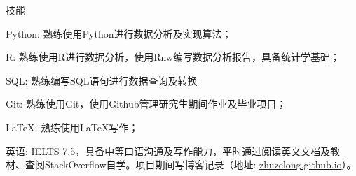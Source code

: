 \documentclass{resume} %
\begin{document}
\begin{rSection}{技能}

\begin{rSubsection}{}{}{}{}
\item {Python:} 熟练使用Python进行数据分析及实现算法；
\item {R:} 熟练使用R进行数据分析，使用Rnw编写数据分析报告，具备统计学基础；
\item {SQL:} 熟练编写SQL语句进行数据查询及转换
\item {Git:} 熟练使用Git，使用Github管理研究生期间作业及毕业项目；
\item {\LaTeX:} 熟练使用\LaTeX{}写作；
\item{英语:} IELTS 7.5，具备中等口语沟通及写作能力，平时通过阅读英文文档及教材、查阅StackOverflow自学。项目期间写博客记录（地址: \url{zhuzelong.github.io}）。
\end{rSubsection}

\end{rSection}



\end{document}
